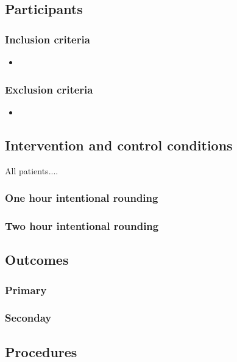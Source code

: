 \documentclass[12pt]{article}
\begin{document}
\subsection{Participants}
\subsubsection{Inclusion criteria}
\begin{itemize}
    \item 
\end{itemize}

\subsubsection{Exclusion criteria}
\begin{itemize}
    \item 
\end{itemize}

\subsection{Intervention and control conditions}
All patients....

\subsubsection{One hour intentional rounding}

\subsubsection{Two hour intentional rounding}

\subsection{Outcomes}

\subsubsection{Primary}

\subsubsection{Seconday}

\subsection{Procedures}
\end{document}
